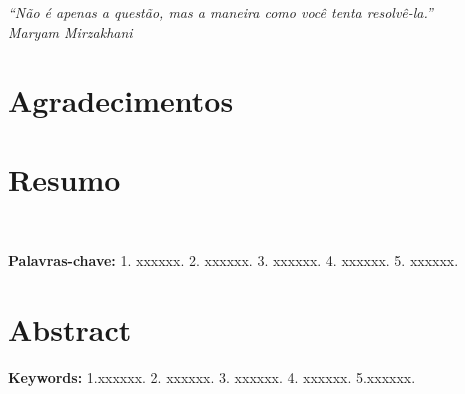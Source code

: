 \documentclass[oneside,a4paper,12pt]{book}
\newcounter{dummy}
\theoremstyle{plain}
\newcommand{\myKeyWordONE}{1. xxxxxx. \xspace}
\newcommand{\myKeyWordTWO}{2. xxxxxx. \xspace}
\newcommand{\myKeyWordTHREE}{3. xxxxxx. \xspace}
\newcommand{\myKeyWordFOUR}{4. xxxxxx. \xspace}
\newcommand{\myKeyWordFIVE}{5. xxxxxx. \xspace}
\newcommand{\myKeyWordONEeng}{1.xxxxxx. \xspace}
\newcommand{\myKeyWordTWOeng}{2. xxxxxx.\xspace}
\newcommand{\myKeyWordTHREEeng}{3. xxxxxx.  \xspace}
\newcommand{\myKeyWordFOUReng}{4. xxxxxx.  \xspace}
\newcommand{\myKeyWordFIVEeng}{5.xxxxxx.  \xspace}
\begin{document}
	\vfill
	
	
	
	
	\newpage
	\thispagestyle{plain}

\hfill

\vfill

\begin{flushright}
	{\slshape
	``Não é apenas a questão, mas a maneira como você tenta resolvê-la.'' 
	\\ Maryam Mirzakhani
	} %
\end{flushright}


\chapter*{Agradecimentos}






\newpage
\begingroup
\let\clearpage\relax
\let\cleardoublepage\relax
\let\cleardoublepage\relax
\chapter*{Resumo}
\noindent








\

\noindent
\textbf{Palavras-chave:} \myKeyWordONE \myKeyWordTWO \myKeyWordTHREE \myKeyWordFOUR \myKeyWordFIVE 

	
	
\newpage



\chapter*{Abstract}
\noindent




\noindent
\textbf{Keywords:} \myKeyWordONEeng \myKeyWordTWOeng \myKeyWordTHREEeng \myKeyWordFOUReng \myKeyWordFIVEeng
\endgroup			

\vfill


\mainmatter
\tableofcontents 
\end{document}
